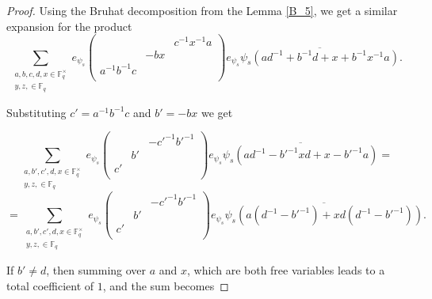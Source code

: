 \documentclass[12pt,reqno]{amsart}
\theoremstyle{definition}
\theoremstyle{remark}
\numberwithin{equation}{section}
\begin{document}
\begin{proof}
    Using the Bruhat decomposition from the Lemma \ref{B_5}, we get a similar expansion for the product
    \begin{equation*}
        \sum_{\substack{a, b, c,d, x \in \mathbb{F}_q^\times\\y, z, \in \mathbb{F}_q}}e_{\psi_s} \begin{pmatrix}
            & & c^{-1}x^{-1}a\\
            & -bx & \\
            a^{-1}b^{-1}c & &\\
        \end{pmatrix} e_{\psi_s} \overline{\psi_s(ad^{-1}+b^{-1}d+x+b^{-1}x^{-1}a)}.
    \end{equation*}


    Substituting $c' = a^{-1}b^{-1}c$ and $b' = -bx$ we get

    \begin{equation*}
        \sum_{\substack{a, b', c',d, x \in \mathbb{F}_q^\times\\y, z, \in \mathbb{F}_q}}e_{\psi_s} \begin{pmatrix}
            & & -c'^{-1}b'^{-1}\\
            & b' & \\
            c' & &\\
        \end{pmatrix} e_{\psi_s} \overline{\psi_s(ad^{-1}-b'^{-1}xd+x-b'^{-1}a)}=
    \end{equation*}
    \begin{equation*}
        = \sum_{\substack{a, b', c',d, x \in \mathbb{F}_q^\times\\y, z, \in \mathbb{F}_q}}e_{\psi_s} \begin{pmatrix}
            & & -c'^{-1}b'^{-1}\\
            & b' & \\
            c' & &\\
        \end{pmatrix} e_{\psi_s} \overline{\psi_s(a(d^{-1}-b'^{-1})+xd(d^{-1}-b'^{-1}))}.
    \end{equation*}

    If $b' \ne d$, then summing over $a$ and $x$, which are both free variables leads to a total coefficient of $1$, and the sum becomes


\end{proof}
\end{document}
